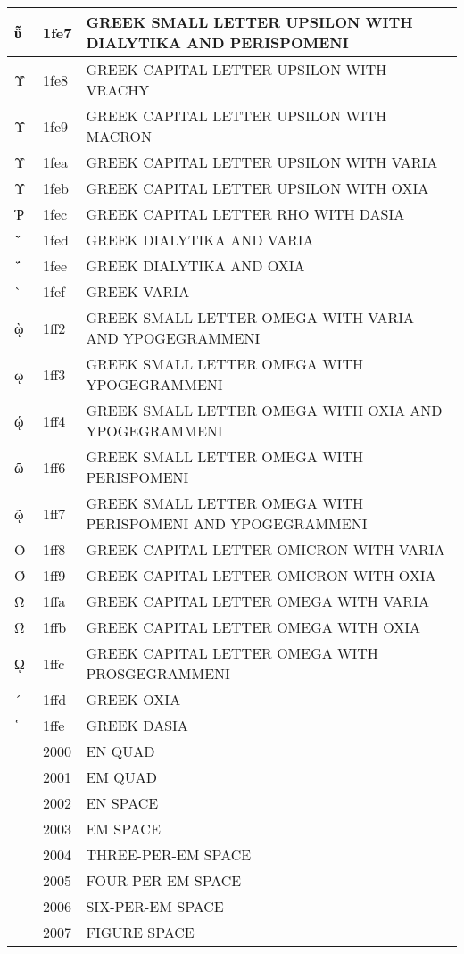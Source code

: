 \documentclass[12pt,letterpaper,openany]{book}
\begin{document}
\begin{center}
\begin{supertabular}{|m{0.25in}|m{0.5in}|m{4in}|}
ῧ & 1fe7 & GREEK SMALL LETTER UPSILON WITH DIALYTIKA AND PERISPOMENI\\\hline
Ῠ & 1fe8 & GREEK CAPITAL LETTER UPSILON WITH VRACHY\\\hline
Ῡ & 1fe9 & GREEK CAPITAL LETTER UPSILON WITH MACRON\\\hline
Ὺ & 1fea & GREEK CAPITAL LETTER UPSILON WITH VARIA\\\hline
Ύ & 1feb & GREEK CAPITAL LETTER UPSILON WITH OXIA\\\hline
Ῥ & 1fec & GREEK CAPITAL LETTER RHO WITH DASIA\\\hline
῭ & 1fed & GREEK DIALYTIKA AND VARIA\\\hline
΅ & 1fee & GREEK DIALYTIKA AND OXIA\\\hline
` & 1fef & GREEK VARIA\\\hline
ῲ & 1ff2 & GREEK SMALL LETTER OMEGA WITH VARIA AND YPOGEGRAMMENI\\\hline
ῳ & 1ff3 & GREEK SMALL LETTER OMEGA WITH YPOGEGRAMMENI\\\hline
ῴ & 1ff4 & GREEK SMALL LETTER OMEGA WITH OXIA AND YPOGEGRAMMENI\\\hline
ῶ & 1ff6 & GREEK SMALL LETTER OMEGA WITH PERISPOMENI\\\hline
ῷ & 1ff7 & GREEK SMALL LETTER OMEGA WITH PERISPOMENI AND YPOGEGRAMMENI\\\hline
Ὸ & 1ff8 & GREEK CAPITAL LETTER OMICRON WITH VARIA\\\hline
Ό & 1ff9 & GREEK CAPITAL LETTER OMICRON WITH OXIA\\\hline
Ὼ & 1ffa & GREEK CAPITAL LETTER OMEGA WITH VARIA\\\hline
Ώ & 1ffb & GREEK CAPITAL LETTER OMEGA WITH OXIA\\\hline
ῼ & 1ffc & GREEK CAPITAL LETTER OMEGA WITH PROSGEGRAMMENI\\\hline
´ & 1ffd & GREEK OXIA\\\hline
῾ & 1ffe & GREEK DASIA\\\hline
  & 2000 & EN QUAD\\\hline
  & 2001 & EM QUAD\\\hline
  & 2002 & EN SPACE\\\hline
  & 2003 & EM SPACE\\\hline
  & 2004 & THREE-PER-EM SPACE\\\hline
  & 2005 & FOUR-PER-EM SPACE\\\hline
  & 2006 & SIX-PER-EM SPACE\\\hline
  & 2007 & FIGURE SPACE\\\hline

\end{supertabular}
\end{center}
\end{document}

